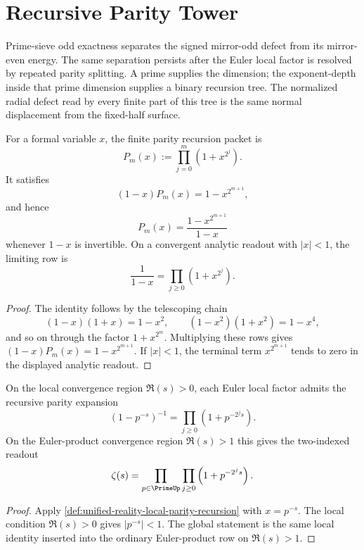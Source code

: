 \section{Recursive Parity Tower}
\label{sec:unified-reality-recursive-parity-tower}

Prime-sieve odd exactness separates the signed mirror-odd defect from
its mirror-even energy.  The same separation persists after the Euler
local factor is resolved by repeated parity splitting.  A prime supplies
the dimension; the exponent-depth inside that prime dimension supplies a
binary recursion tree.  The normalized radial defect read by every finite
part of this tree is the same normal displacement from the fixed-half
surface.

\begin{definition}
\label{def:unified-reality-local-parity-recursion}
For a formal variable $x$, the finite parity recursion packet is
$$
P_m(x):=\prod_{j=0}^{m}(1+x^{2^j}).
$$
It satisfies
$$
(1-x)P_m(x)=1-x^{2^{m+1}},
$$
and hence
$$
P_m(x)=\frac{1-x^{2^{m+1}}}{1-x}
$$
whenever $1-x$ is invertible.  On a convergent analytic readout with
$|x|<1$, the limiting row is
$$
\frac1{1-x}=\prod_{j\ge0}(1+x^{2^j}).
$$
\end{definition}

\begin{proof}
The identity follows by the telescoping chain
$$
(1-x)(1+x)=1-x^2,
\qquad
(1-x^2)(1+x^2)=1-x^4,
$$
and so on through the factor $1+x^{2^m}$.  Multiplying these rows gives
$(1-x)P_m(x)=1-x^{2^{m+1}}$.  If $|x|<1$, the terminal term
$x^{2^{m+1}}$ tends to zero in the displayed analytic readout.
\end{proof}

\begin{theorem}
\label{thm:unified-reality-euler-local-factor-recursive-parity-tree}
On the local convergence region $\Re(s)>0$, each Euler local factor
admits the recursive parity expansion
$$
(1-p^{-s})^{-1}
=
\prod_{j\ge0}\left(1+p^{-2^j s}\right).
$$
On the Euler-product convergence region $\Re(s)>1$ this gives the
two-indexed readout
$$
\zeta(s)
=
\prod_{p\in\PrimeUp}
\prod_{j\ge0}
\left(1+p^{-2^j s}\right).
$$
\end{theorem}

\begin{proof}
Apply \autoref{def:unified-reality-local-parity-recursion} with
$x=p^{-s}$.  The local condition $\Re(s)>0$ gives $|p^{-s}|<1$.  The
global statement is the same local identity inserted into the ordinary
Euler-product row on $\Re(s)>1$.
\end{proof}

